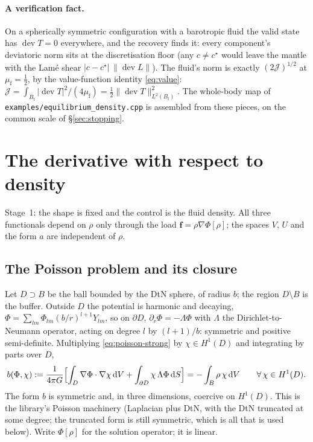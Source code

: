 \documentclass[11pt]{article}
\newcommand{\Jf}{\mathscr{J}}  %
\newcommand{\Bf}{B_{\mathrm{f}}}
\newcommand{\bff}{\mathbf{f}}
\newcommand{\dS}{\,\mathrm{d}S}
\newcommand{\dV}{\,\mathrm{d}V}
\newcommand{\dev}{\operatorname{dev}}
\newcommand{\norm}[1]{\lVert #1 \rVert}
\begin{document}
\paragraph{A verification fact.} On a spherically symmetric configuration
with a barotropic fluid the valid state has $\dev T = 0$ everywhere, and
the recovery finds it: every component's deviatoric norm sits at the
discretisation floor (any $c \ne c^\star$ would leave the mantle with the
Lam\'e shear $|c - c^\star|\,\norm{\dev L}$). The fluid's norm is exactly
$(2\Jf )^{1/2}$ at $\mu_{\mathrm{f}} = \tfrac12$, by the value-function
identity \eqref{eq:value}: $\Jf  = \int_{\Bf}|\dev T|^2/(4\mu_{\mathrm{f}})
= \tfrac12\norm{\dev T}^2_{L^2(\Bf)}$. The whole-body map of
\texttt{examples/equilibrium\_density.cpp} is assembled from these
pieces, on the common scale of \S\ref{sec:stopping}.

\section{The derivative with respect to density}
\label{sec:derivative}

Stage~1: the shape is fixed and the control is the fluid density. All
three functionals depend on $\rho$ only through the load $\bff =
\rho\nabla\Phi[\rho]$; the spaces $V$, $U$ and the form $a$ are
independent of $\rho$.

\subsection{The Poisson problem and its closure}
\label{sec:poisson}

Let $D \supset B$ be the ball bounded by the DtN sphere, of radius $b$;
the region $D\setminus B$ is the buffer. Outside $D$ the potential is
harmonic and decaying, $\Phi = \sum_{lm}\Phi_{lm}(b/r)^{l+1}Y_{lm}$, so on
$\partial D$, $\partial_r\Phi = -\Lambda\Phi$ with $\Lambda$ the
Dirichlet-to-Neumann operator, acting on degree $l$ by $(l+1)/b$:
symmetric and positive semi-definite. Multiplying
\eqref{eq:poisson-strong} by $\chi\in H^1(D)$ and integrating by parts
over $D$,
\begin{equation}
  b(\Phi,\chi) := \frac{1}{4\pi G}\Bigl[\int_D \nabla\Phi\cdot\nabla\chi\dV
  + \int_{\partial D}\chi\,\Lambda\Phi\dS\Bigr]
  = -\int_B \rho\,\chi\dV
  \qquad\forall\,\chi\in H^1(D) .
  \label{eq:poisson-weak}
\end{equation}
The form $b$ is symmetric and, in three dimensions, coercive on $H^1(D)$.
This is the library's Poisson machinery (Laplacian plus DtN, with the DtN
truncated at some degree; the truncated form is still symmetric, which
is all that is used below). Write $\Phi[\rho]$ for the solution operator;
it is linear.
\end{document}
